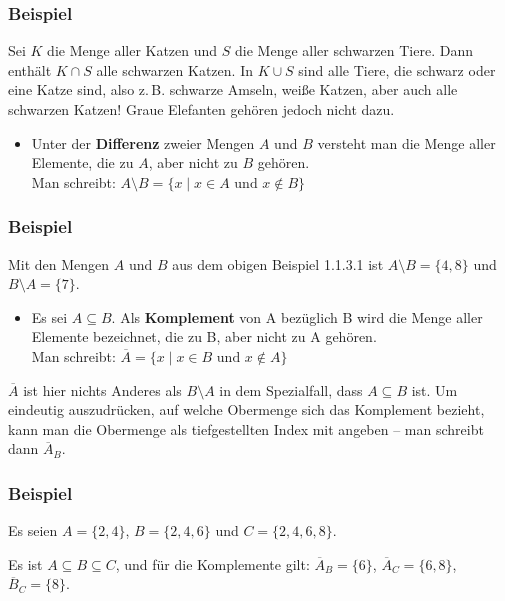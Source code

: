 \subsubsection{Beispiel}

Sei $K$ die Menge aller Katzen und $S$ die Menge aller schwarzen Tiere. Dann enthält $K \cap S$ alle schwarzen Katzen.
In $K \cup S$ sind alle Tiere, die schwarz oder eine Katze sind, also z.\,B. schwarze Amseln, weiße Katzen, aber auch alle schwarzen Katzen! Graue Elefanten gehören jedoch nicht dazu.\beispielende

\begin{itemize}
  \item Unter der \textbf{Differenz} zweier Mengen $A$ und $B$ versteht man die Menge aller Elemente, die zu $A$, aber nicht zu $B$ gehören.\\
  Man schreibt: $A \setminus B = \{x \mid x\in A \text{ und } x\notin B\}$
\end{itemize}

\subsubsection{Beispiel}

Mit den Mengen $A$ und $B$ aus dem obigen Beispiel 1.1.3.1 ist $A \setminus B = \{4,8\}$ und $B \setminus A = \{7\}$.\beispielende

\begin{itemize}
  \item Es sei $A\subseteq B$. Als \textbf{Komplement} von A bezüglich B wird die Menge aller Elemente bezeichnet, die zu B, aber nicht zu A gehören.\\
  Man schreibt: $\overline{A} = \{x \mid x\in B \text{ und } x\notin A\}$
\end{itemize}

$\overline{A}$ ist hier nichts Anderes als $B\setminus A$ in dem Spezialfall, dass $A\subseteq B$ ist. Um eindeutig auszudrücken, auf welche Obermenge sich das Komplement bezieht, kann man die Obermenge als tiefgestellten Index mit angeben -- man schreibt dann $\overline{A}_B$.

\subsubsection{Beispiel}

Es seien $A = \{2,4\}$, $B = \{2,4,6\}$ und $C = \{2,4,6,8\}$.

Es ist $A \subseteq B \subseteq C$, und für die Komplemente gilt:
$\overline{A}_B = \{6\}$, $\overline{A}_C = \{6,8\}$, $\overline{B}_C = \{8\}$.\beispielende

